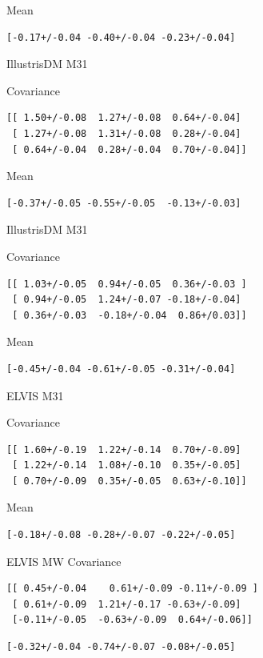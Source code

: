\documentclass[a4paper,fleqn,usenatbib]{mnras}
\begin{document}
Mean
\begin{verbatim}
[-0.17+/-0.04 -0.40+/-0.04 -0.23+/-0.04]
\end{verbatim}



IllustrisDM M31

Covariance
\begin{verbatim}
[[ 1.50+/-0.08  1.27+/-0.08  0.64+/-0.04]
 [ 1.27+/-0.08  1.31+/-0.08  0.28+/-0.04]
 [ 0.64+/-0.04  0.28+/-0.04  0.70+/-0.04]]
\end{verbatim}

Mean
\begin{verbatim}
[-0.37+/-0.05 -0.55+/-0.05  -0.13+/-0.03]
\end{verbatim}

IllustrisDM M31

Covariance
\begin{verbatim}
[[ 1.03+/-0.05  0.94+/-0.05  0.36+/-0.03 ]
 [ 0.94+/-0.05  1.24+/-0.07 -0.18+/-0.04]
 [ 0.36+/-0.03  -0.18+/-0.04  0.86+/0.03]]
\end{verbatim}

Mean
\begin{verbatim}
[-0.45+/-0.04 -0.61+/-0.05 -0.31+/-0.04]
\end{verbatim}

ELVIS M31

Covariance
\begin{verbatim}
[[ 1.60+/-0.19  1.22+/-0.14  0.70+/-0.09]
 [ 1.22+/-0.14  1.08+/-0.10  0.35+/-0.05]
 [ 0.70+/-0.09  0.35+/-0.05  0.63+/-0.10]]
\end{verbatim}

Mean
\begin{verbatim}
[-0.18+/-0.08 -0.28+/-0.07 -0.22+/-0.05]
\end{verbatim}

ELVIS MW
Covariance
\begin{verbatim}
[[ 0.45+/-0.04    0.61+/-0.09 -0.11+/-0.09 ]
 [ 0.61+/-0.09  1.21+/-0.17 -0.63+/-0.09]
 [-0.11+/-0.05  -0.63+/-0.09  0.64+/-0.06]]
\end{verbatim}

\begin{verbatim}
[-0.32+/-0.04 -0.74+/-0.07 -0.08+/-0.05]
\end{verbatim}
\end{document}
